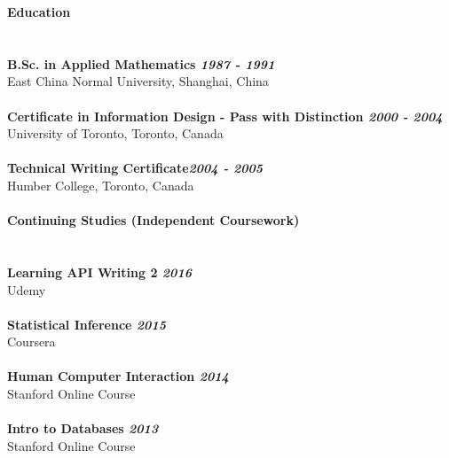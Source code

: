 \documentclass[11pt]{extarticle}
\begin{document}
{\large \bf Education} \\ 
\underline{\hspace{6.55in}} \\
\\
{\bf B.Sc. in Applied Mathematics \hfill \it 1987 - 1991} \\
East China Normal University, Shanghai, China \\
\\
{\bf Certificate in Information Design - Pass with Distinction \hfill \it 2000 - 2004} \\
University of Toronto, Toronto, Canada\\
\\
{\bf Technical Writing Certificate\hfill \it 2004 - 2005}\\
 Humber College, Toronto, Canada\\
\\
{\large \bf Continuing Studies (Independent Coursework)} \\ 
\underline{\hspace{6.55in}} \\
\\
{\bf Learning API Writing 2 \hfill \it 2016} \\
Udemy \\
\\
{\bf Statistical Inference \hfill \it 2015}\\
 Coursera\\
\\
{\bf Human Computer Interaction \hfill \it 2014}\\
 Stanford Online Course\\
\\
{\bf Intro to Databases \hfill \it 2013} \\
Stanford  Online Course\\
\\
\end{document}
